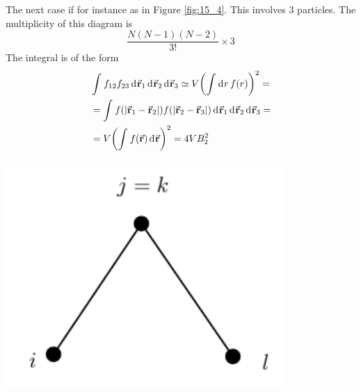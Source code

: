 \documentclass[../main/main.tex]{subfiles}
\begin{document}
\begin{minipage}[c]{0.7\linewidth}
The next case if for instance as in Figure \ref{fig:15_4}. This involves 3 particles.
The multiplicity of this diagram is
\begin{equation}
  \frac{N (N-1) (N-2)}{3!} \times 3
\end{equation}
The integral is of the form
\begin{equation}
\begin{split}
  & \int_{}^{}  f_{12} f_{23} \dd[]{\va{r}_1}  \dd[]{\va{r}_2}   \dd[]{\va{r}_3}
  \simeq V  \qty(  \int_{}^{} \dd[]{r} f(r)  )^2  = \\
  & =   \int_{}^{}  f( \abs{\va{r}_1 - \va{r}_2} )f( \abs{\va{r}_2 - \va{r}_3} ) \dd[]{\va{r}_1}  \dd[]{\va{r}_2}  \dd[]{\va{r}_3}  = \\
  & = V \qty(\int_{}^{} f(\va{r})\dd[]{\va{r}}  )^2  = 4 V B_2^2
\end{split}
\end{equation}
\end{minipage}
\begin{minipage}[]{0.3\linewidth}
\centering
\includegraphics[width=0.8\textwidth]{../lessons/15_image/7.pdf}
\end{minipage}
\end{document}
